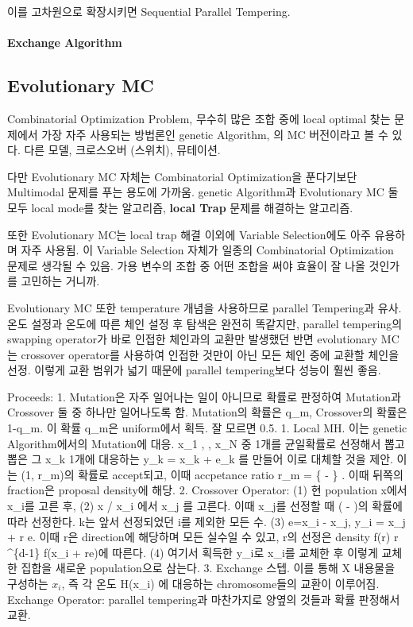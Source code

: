 \documentclass[
]{book}
\begin{document}
이를 고차원으로 확장시키면 Sequential Parallel Tempering.

\hypertarget{exchange-algorithm-1}{%
\paragraph{Exchange Algorithm}\label{exchange-algorithm-1}}

\hypertarget{evolutionary-mc}{%
\subsection{Evolutionary MC}\label{evolutionary-mc}}

Combinatorial Optimization Problem, 무수히 많은 조합 중에 local optimal 찾는 문제에서 가장 자주 사용되는 방법론인 genetic Algorithm, 의 MC 버전이라고 볼 수 있다. 다른 모델, 크로스오버 (스위치), 뮤테이션.

다만 Evolutionary MC 자체는 Combinatorial Optimization을 푼다기보단 Multimodal 문제를 푸는 용도에 가까움. genetic Algorithm과 Evolutionary MC 둘 모두 local mode를 찾는 알고리즘, \textbf{local Trap} 문제를 해결하는 알고리즘.

또한 Evolutionary MC는 local trap 해결 이외에 Variable Selection에도 아주 유용하며 자주 사용됨. 이 Variable Selection 자체가 일종의 Combinatorial Optimization 문제로 생각될 수 있음. 가용 변수의 조합 중 어떤 조합을 써야 효율이 잘 나올 것인가를 고민하는 거니까.

Evolutionary MC 또한 temperature 개념을 사용하므로 parallel Tempering과 유사. 온도 설정과 온도에 따른 체인 설정 후 탐색은 완전히 똑같지만, parallel tempering의 swapping operator가 바로 인접한 체인과의 교환만 발생했던 반면 evolutionary MC는 crossover operator를 사용하여 인접한 것만이 아닌 모든 체인 중에 교환할 체인을 선정. 이렇게 교환 범위가 넓기 때문에 parallel tempering보다 성능이 훨씬 좋음.

Proceeds:
1. Mutation은 자주 일어나는 일이 아니므로 확률로 판정하여 Mutation과 Crossover 둘 중 하나만 일어나도록 함. Mutation의 확률은 q\_m, Crossover의 확률은 1-q\_m. 이 확률 q\_m은 uniform에서 획득. 잘 모르면 0.5.
1. Local MH. 이는 genetic Algorithm에서의 Mutation에 대응. x\_1 , \cdots, x\_N 중 1개를 균일확률로 선정해서 뽑고 뽑은 그 x\_k 1개에 대응하는 y\_k = x\_k + e\_k 를 만들어 이로 대체할 것을 제안. 이는 \min(1, r\_m)의 확률로 accept되고, 이때 accpetance ratio r\_m = \exp \left\{ - \right\} . 이때 뒤쪽의 fraction은 proposal density에 해당.
2. Crossover Operator: (1) 현 population \pmb x에서 x\_i를 고른 후, (2) \pmb x / x\_i 에서 x\_j 를 고른다. 이때 x\_j를 선정할 때 \exp \left( -  \right)의 확률에 따라 선정한다. k는 앞서 선정되었던 i를 제외한 모든 수. (3) e=x\_i - x\_j, y\_i = x\_j + r \ast e. 이때 r은 direction에 해당하며 모든 실수일 수 있고, r의 선정은 density f(r) \propto \vert r \vert \^{}\{d-1\} f(x\_i + re)에 따른다. (4) 여기서 획득한 y\_i로 x\_i를 교체한 후 이렇게 교체한 집합을 새로운 population으로 삼는다.
3. Exchange 스텝. 이를 통해 X 내용물을 구성하는 \(x_i\), 즉 각 온도 H(x\_i) 에 대응하는 chromosome들의 교환이 이루어짐. Exchange Operator: parallel tempering과 마찬가지로 양옆의 것들과 확률 판정해서 교환.
\end{document}
